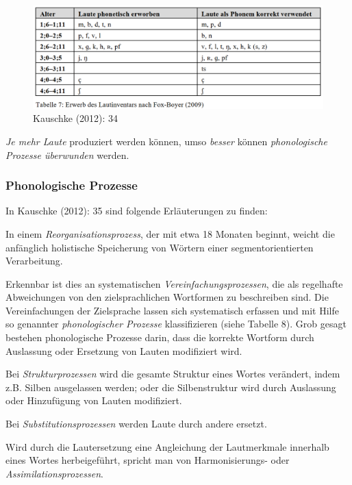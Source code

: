 \documentclass[
  letterpaper,
]{scrbook}
\begin{document}
\begin{figure}

{\centering \includegraphics[width=1\textwidth,height=\textheight]{./pictures/L1_Entwicklung_kauschke_Tab7.png}

}

\caption{Kauschke (2012): 34}

\end{figure}

\emph{Je mehr Laute} produziert werden können, umso \emph{besser} können
\emph{phonologische Prozesse überwunden} werden.

\hypertarget{phonologische-prozesse}{%
\subsubsection{Phonologische Prozesse}\label{phonologische-prozesse}}

In Kauschke (2012): 35 sind folgende Erläuterungen zu finden:

In einem \emph{Reorganisationsprozess}, der mit etwa 18 Monaten beginnt,
weicht die anfänglich holistische Speicherung von Wörtern einer
segmentorientierten Verarbeitung.

Erkennbar ist dies an systematischen \emph{Vereinfachungsprozessen}, die
als regelhafte Abweichungen von den zielsprachlichen Wortformen zu
beschreiben sind. Die Vereinfachungen der Zielsprache lassen sich
systematisch erfassen und mit Hilfe so genannter \emph{phonologischer
Prozesse} klassifizieren (siehe Tabelle 8). Grob gesagt bestehen
phonologische Prozesse darin, dass die korrekte Wortform durch
Auslassung oder Ersetzung von Lauten modifiziert wird.

Bei \emph{Strukturprozessen} wird die gesamte Struktur eines Wortes
verändert, indem z.B. Silben ausgelassen werden; oder die Silbenstruktur
wird durch Auslassung oder Hinzufügung von Lauten modifiziert.

Bei \emph{Substitutionsprozessen} werden Laute durch andere ersetzt.

Wird durch die Lautersetzung eine Angleichung der Lautmerkmale innerhalb
eines Wortes herbeigeführt, spricht man von Harmonisierungs- oder
\emph{Assimilationsprozessen}.
\end{document}
